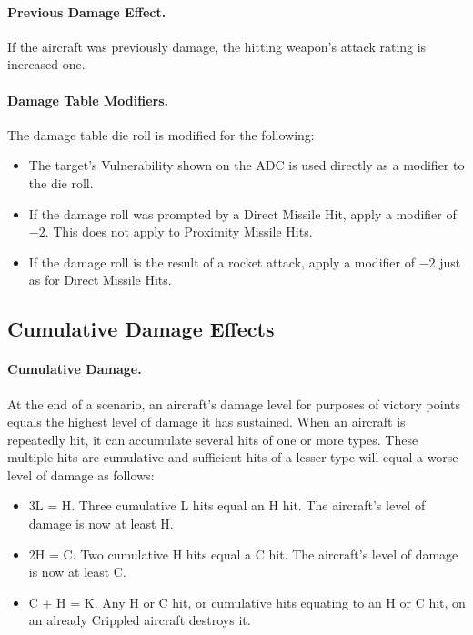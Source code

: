 \paragraph{Previous Damage Effect.} If the aircraft was previously damage, the hitting weapon's attack rating is increased one.

\paragraph{Damage Table Modifiers.} The damage table die roll is modified for the following:

\begin{itemize}

    \item{} The target's Vulnerability shown on the ADC is used directly as a modifier to the die roll.
    
    \item{} If the damage roll was prompted by a Direct Missile Hit, apply a modifier of $-2$. This does not apply to Proximity Missile Hits.
    
    \item{} If the damage roll is the result of a rocket attack, apply a modifier of $-2$ just as for Direct Missile Hits.
    
\end{itemize}

\subsection{Cumulative Damage Effects}

\paragraph{Cumulative Damage.} At the end of a scenario, an aircraft's damage level for purposes of victory points equals the highest level of damage it has sustained. When an aircraft is repeatedly hit, it can accumulate several hits of one or more types. These multiple hits are cumulative and sufficient hits of a lesser type will equal a worse level of damage as follows:

\begin{itemize}

    \item 3L = H. Three cumulative L hits equal an H hit. The aircraft's level of damage is now at least H.

    \item 2H = C. Two cumulative H hits equal a C hit. The aircraft's level of damage is now at least C.

    \item C + H = K. Any H or C hit, or cumulative hits equating to an H or C hit, on an already Crippled aircraft destroys it.
    
\end{itemize}

